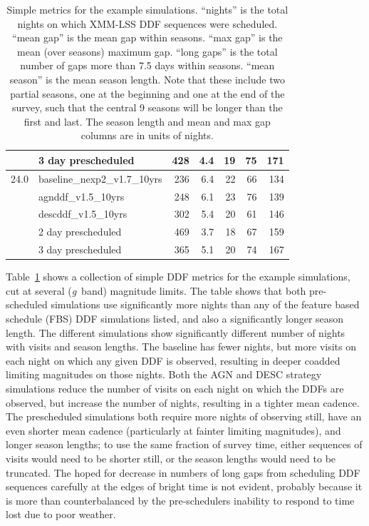 \documentclass[DM,authoryear,toc]{lsstdoc}
\begin{document}
\begin{table}[t]
\begin{tabular}{llrrrrr}
     & 3 day prescheduled &         428 &       4.4 &       19 &         75 &            171 \\
\hline
24.0 & baseline\_nexp2\_v1.7\_10yrs &         236 &       6.4 &       22 &         66 &            134 \\
     & agnddf\_v1.5\_10yrs &         248 &       6.1 &       23 &         76 &            139 \\
     & descddf\_v1.5\_10yrs &         302 &       5.4 &       20 &         61 &            146 \\
     & 2 day prescheduled &         469 &       3.7 &       18 &         67 &            159 \\
     & 3 day prescheduled &         365 &       5.1 &       20 &         74 &            167 \\
\hline
\end{tabular}
  \caption{
    Simple metrics for the example simulations.
    ``nights'' is the total nights on which XMM-LSS DDF sequences were scheduled.
    ``mean gap'' is the mean gap within seasons.
    ``max gap'' is the mean (over seasons) maximum gap.
    ``long gaps'' is the total number of gaps more than 7.5 days within seasons.
    ``mean season'' is the mean season length.
    Note that these include two partial seasons, one at the beginning and one at the end of the survey, such that the central 9 seasons will be longer than the first and last.
    The season length and mean and max gap columns are in units of nights. 
  }
\label{tab:simplemetrics}
\end{table}

Table~\ref{tab:simplemetrics} shows a collection of simple DDF metrics for the example simulations, cut at several ({\it g}~band) magnitude limits.
The table shows that both pre-scheduled simulations use significantly more nights than any of the feature based schedule (FBS) DDF simulations listed, and also a significantly longer season length.
The different simulations show significantly different number of nights with visits and season lengths.
The baseline has fewer nights, but more visits on each night on which any given DDF is observed, resulting in deeper coadded limiting magnitudes on those nights.
Both the AGN and DESC strategy simulations reduce the number of visits on each night on which the DDFs are observed, but increase the number of nights, resulting in a tighter mean cadence.
The prescheduled simulations both require more nights of observing still, have an even shorter mean cadence (particularly at fainter limiting magnitudes), and longer season lengths; to use the same fraction of survey time, either sequences of visits would need to be shorter still, or the season lengths would need to be truncated.
The hoped for decrease in numbers of long gaps from scheduling DDF sequences carefully at the edges of bright time is not evident, probably because it is more than counterbalanced by the pre-schedulers inability to respond to time lost due to poor weather.
\end{document}
